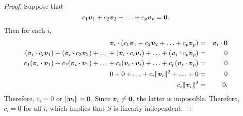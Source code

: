 
\begin{proof}
Suppose that 
\[c_1\boldsymbol v_1 + c_2\boldsymbol v_2 + \ldots + c_p\boldsymbol v_p = \boldsymbol 0.\] Then for each $i$,
\begin{eqnarray*}
\boldsymbol v_i \cdot (c_1\boldsymbol v_1 + c_2\boldsymbol v_2 + \ldots + c_p\boldsymbol v_p) &=& \boldsymbol v_i\cdot  \boldsymbol 0 \\
(\boldsymbol v_i \cdot c_i\boldsymbol v_1)  + ( \boldsymbol v_i\cdot c_2\boldsymbol v_2) + \ldots + ( \boldsymbol v_i\cdot c_i\boldsymbol v_i) + \ldots + ( \boldsymbol v_i\cdot c_p\boldsymbol v_p) &=&  0\\
c_1( \boldsymbol v_i\cdot \boldsymbol v_1) + c_2( \boldsymbol v_i\cdot \boldsymbol v_2) + \ldots + c_i(\boldsymbol v_i\cdot \boldsymbol v_i) + \ldots + c_p( \boldsymbol v_i\cdot \boldsymbol v_p) &=&  0\\
0+ 0 + \ldots + c_i\Vert \boldsymbol v_i\Vert^2 + \ldots + 0 &=&  0\\
c_i\Vert \boldsymbol v_i\Vert^2&=&  0. 
\end{eqnarray*} Therefore, $c_i = 0$ or $\Vert \boldsymbol v_i\Vert = 0$. Since $\boldsymbol v_i\neq \boldsymbol 0$, the latter is impossible. Therefore, $c_i = 0$ for all $i$, which implies that $S$ is linearly independent.
\end{proof}\vs

